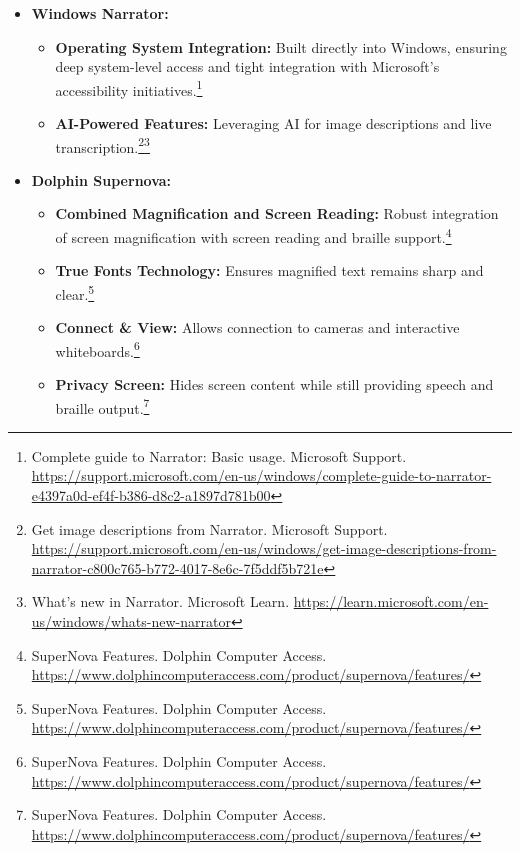 \begin{itemize}[leftmargin=*,noitemsep,topsep=0pt]
\begin{itemize}[leftmargin=*,noitemsep,topsep=0pt]
        \item \textbf{Speech and Braille Viewers:} Built-in tools for sighted users to visualize output.\footnote{NVDA User Guide: Speech. NV Access. \url{https://www.nvaccess.org/files/nvda/documentation/userGuide.html#Speech}}\footnote{NVDA User Guide: Braille. NV Access. \url{https://www.nvaccess.org/files/nvda/documentation/userGuide.html#Braille}}
    \end{itemize}
    \item \textbf{Windows Narrator:}
    \begin{itemize}[leftmargin=*,noitemsep,topsep=0pt]
        \item \textbf{Operating System Integration:} Built directly into Windows, ensuring deep system-level access and tight integration with Microsoft's accessibility initiatives.\footnote{Complete guide to Narrator: Basic usage. Microsoft Support. \url{https://support.microsoft.com/en-us/windows/complete-guide-to-narrator-e4397a0d-ef4f-b386-d8c2-a1897d781b00}}
        \item \textbf{AI-Powered Features:} Leveraging AI for image descriptions and live transcription.\footnote{Get image descriptions from Narrator. Microsoft Support. \url{https://support.microsoft.com/en-us/windows/get-image-descriptions-from-narrator-c800c765-b772-4017-8e6c-7f5ddf5b721e}}\footnote{What's new in Narrator. Microsoft Learn. \url{https://learn.microsoft.com/en-us/windows/whats-new-narrator}}
    \end{itemize}
    \item \textbf{Dolphin Supernova:}
    \begin{itemize}[leftmargin=*,noitemsep,topsep=0pt]
        \item \textbf{Combined Magnification and Screen Reading:} Robust integration of screen magnification with screen reading and braille support.\footnote{SuperNova Features. Dolphin Computer Access. \url{https://www.dolphincomputeraccess.com/product/supernova/features/}}
        \item \textbf{True Fonts Technology:} Ensures magnified text remains sharp and clear.\footnote{SuperNova Features. Dolphin Computer Access. \url{https://www.dolphincomputeraccess.com/product/supernova/features/}}
        \item \textbf{Connect \& View:} Allows connection to cameras and interactive whiteboards.\footnote{SuperNova Features. Dolphin Computer Access. \url{https://www.dolphincomputeraccess.com/product/supernova/features/}}
        \item \textbf{Privacy Screen:} Hides screen content while still providing speech and braille output.\footnote{SuperNova Features. Dolphin Computer Access. \url{https://www.dolphincomputeraccess.com/product/supernova/features/}}
    \end{itemize}
\end{itemize}

